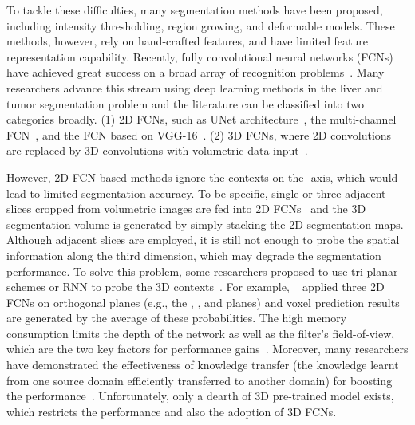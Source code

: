 \documentclass[journal]{IEEEtran}
\begin{document}
To tackle these difficulties, many segmentation methods have been proposed, including intensity thresholding, region growing, and deformable models. These methods,
however, rely on hand-crafted features, and have limited feature
representation capability.
Recently, fully convolutional neural networks (FCNs) have achieved great success on a broad array of recognition problems~\citep{prasoon2013deep, ronneberger2015u,stollenga2015parallel, roth2015deeporgan,wang2015detection, li2016multi, cciccek20163d, havaei2017brain,chen2017voxresnet,wang2017liver,li20183d}. Many researchers advance this stream using deep learning methods in the liver and tumor segmentation problem and the literature can be classified into two categories broadly.
(1) 2D FCNs, such as UNet architecture~\citep{christ2016automatic}, the multi-channel FCN~\citep{sun2017automatic}, and the FCN based on VGG-16~\citep{ben2016fully}.
(2) 3D FCNs, where 2D convolutions are replaced by 3D convolutions with volumetric data input~\citep{dou20163d,lu2017automatic}.

However, 2D FCN based methods ignore the contexts on the -axis, which would lead to limited segmentation accuracy. To be specific, single or three adjacent slices cropped from volumetric images are fed into 2D FCNs~\citep{sun2017automatic,ben2016fully} and the 3D segmentation volume is generated by simply stacking the 2D segmentation maps. Although adjacent slices are employed, it is still not enough to probe the spatial information along the third dimension, which may degrade the segmentation performance.
To solve this problem, some researchers proposed to use tri-planar schemes or RNN to probe the 3D contexts~\citep{prasoon2013deep, tseng2017joint, cai2017improving}.
For example, ~\citet{prasoon2013deep} applied three 2D FCNs on orthogonal planes (e.g., the , , and  planes) and voxel prediction results are generated by the average of these probabilities.
The high memory consumption limits the depth of the network as well as the filter's field-of-view, which are the two key factors for performance gains~\citep{simonyan2014very}.
Moreover, many researchers have demonstrated the effectiveness of knowledge transfer (the knowledge learnt from one source
domain efficiently transferred to another domain) for boosting the performance~\citep{chen2015standard,tajbakhsh2016convolutional}.
Unfortunately, only a dearth of 3D pre-trained model exists, which restricts the performance and also the adoption of 3D FCNs.
\end{document}
